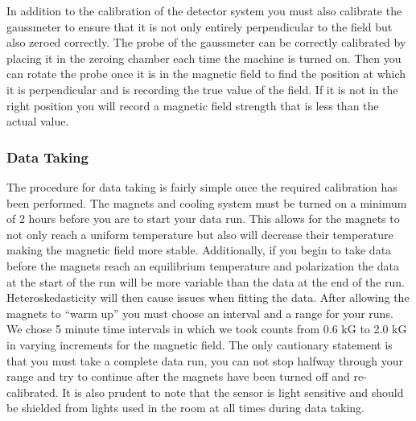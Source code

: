 In addition to the calibration of the detector system you must also calibrate the gaussmeter to ensure that it is not only entirely perpendicular to the field but also zeroed correctly.  The probe of the gaussmeter can be correctly calibrated by placing it in the zeroing chamber each time the machine is turned on. Then you can rotate the probe once it is in the magnetic field to find the position at which it is perpendicular and is recording the true value of the field. If it is not in the right position you will record a magnetic field strength that is less than the actual value.  

\subsubsection{Data Taking}

The procedure for data taking is fairly simple once the required calibration has been performed.  The magnets and cooling system must be turned on a minimum of 2 hours before you are to start your data run.  This allows for the magnets to not only reach a uniform temperature but also will decrease their temperature making the magnetic field more stable. Additionally, if you begin to take data before the magnets reach an equilibrium temperature and polarization the data at the start of the run will be more variable than the data at the end of the run. Heteroskedasticity will then cause issues when fitting the data. After allowing the magnets to ``warm up'' you must choose an interval and a range for your runs.  We chose 5 minute time intervals in which we took counts from 0.6 kG to 2.0 kG in varying increments for the magnetic field.  The only cautionary statement is that you must take a complete data run, you can not stop halfway through your range and try to continue after the magnets have been turned off and re-calibrated. It is also prudent to note that the sensor is light sensitive and should be shielded from lights used in the room at all times during data taking. 

